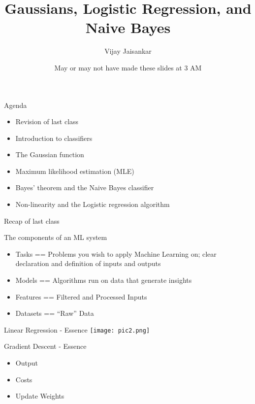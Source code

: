 \documentclass{beamer}
\title[ML]{Gaussians, Logistic Regression, and Naive Bayes}
\author{Vijay Jaisankar}
\institute{Teaching Assistant}
\date{May or may not have made these slides at 3 AM}
\begin{document}
\begin{frame}
\titlepage
\end{frame}



\begin{frame}
    Agenda  
    \begin{itemize}
        \item Revision of last class
        \item Introduction to classifiers
        \item The Gaussian function
        \item Maximum likelihood estimation (MLE)
        \item Bayes' theorem and the Naive Bayes classifier
        \item Non-linearity and the Logistic regression algorithm
    \end{itemize}
\end{frame}

\begin{frame}
    Recap of last class
\end{frame}

\begin{frame}{The components of an ML system}
    \begin{itemize}
        \item Tasks == Problems you wish to apply Machine Learning on; clear
declaration and definition of inputs and outputs
        \item Models == Algorithms run on data that generate insights
        \item Features == Filtered and Processed Inputs
        \item Datasets == “Raw” Data
    \end{itemize}
\end{frame}

\begin{frame}{Linear Regression - Essence}
\texttt{[image: pic2.png]}
\end{frame}

\begin{frame}{Gradient Descent - Essence}
    \begin{itemize}
        \item Output
        \item Costs 
        \item Update Weights
    \end{itemize}
\end{frame}
\end{document}
